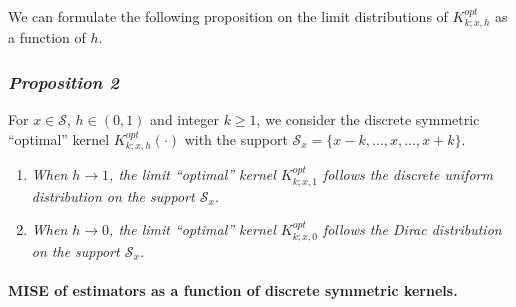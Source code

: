 We can formulate the following proposition on the limit distributions of \(K_{k;x,h}^{opt}\) as a function of \(h\).

\subsubsection{\texorpdfstring{\emph{Proposition 2}}{Proposition 2}}\label{proposition-2}

For \(x\in\mathcal{S}\), \(h\in(0,1)\) and integer \(k\geq1\), we consider the discrete symmetric ``optimal'' kernel \(K_{k;x,h}^{opt}(\cdot)\) with the support \(\mathcal{S}_{x}=\{x-k,\ldots,x,\ldots,x+k\}\).

\begin{enumerate}
\def\labelenumi{\roman{enumi}.}
\tightlist
\item
  \emph{When \(h\to 1\), the limit ``optimal'' kernel \(K_{k;x,1}^{opt}\) follows the discrete uniform distribution on the support \(\mathcal{S}_{x}\).}
\item
  \emph{When \(h\to 0\), the limit ``optimal'' kernel \(K_{k;x,0}^{opt}\) follows the Dirac distribution on the support \(\mathcal{S}_{x}\).}\\
\end{enumerate}

\paragraph{MISE of estimators as a function of discrete symmetric kernels.}

